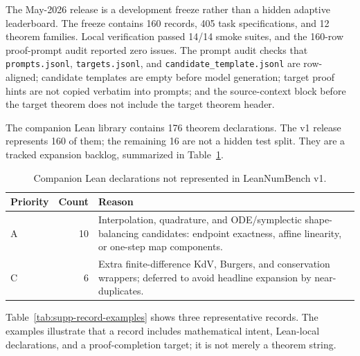 The May-2026 release is a development freeze rather than a hidden adaptive
leaderboard. The freeze contains 160 records, 405 task specifications, and 12
theorem families. Local verification passed 14/14 smoke suites, and the
160-row proof-prompt audit reported zero issues. The prompt audit checks that
\texttt{prompts.jsonl}, \texttt{targets.jsonl}, and
\texttt{candidate\_template.jsonl} are row-aligned; candidate templates are
empty before model generation; target proof hints are not copied verbatim into
prompts; and the source-context block before the target theorem does not
include the target theorem header.

The companion Lean library contains 176 theorem declarations. The v1 release
represents 160 of them; the remaining 16 are not a hidden test split. They are
a tracked expansion backlog, summarized in Table~\ref{tab:supp-missing-lean}.

\begin{table}[H]
\centering
\caption{Companion Lean declarations not represented in LeanNumBench v1.}
\label{tab:supp-missing-lean}
\small
\begin{tabularx}{\linewidth}{lrX}
\toprule
Priority & Count & Reason\\
\midrule
A & 10 & Interpolation, quadrature, and ODE/symplectic shape-balancing
candidates: endpoint exactness, affine linearity, or one-step map components.\\
C & 6 & Extra finite-difference KdV, Burgers, and conservation wrappers;
deferred to avoid headline expansion by near-duplicates.\\
\bottomrule
\end{tabularx}
\end{table}

Table~\ref{tab:supp-record-examples} shows three representative records. The
examples illustrate that a record includes mathematical intent, Lean-local
declarations, and a proof-completion target; it is not merely a theorem string.

